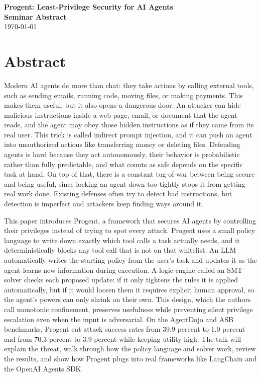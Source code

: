 \documentclass[12pt]{article}
\newcommand{\seminardate}{\today}
\begin{document}
\begin{center}
  {\LARGE\bfseries Progent: Least-Privilege Security for AI Agents}\\[8pt]
  {\large\bfseries Seminar Abstract}\\[6pt]
  {\normalsize \seminardate}
\end{center}
\vspace{1.5em}

\section*{Abstract}
Modern AI agents do more than chat: they take actions by calling external tools, such as sending emails, running code, moving files, or making payments. This makes them useful, but it also opens a dangerous door. An attacker can hide malicious instructions inside a web page, email, or document that the agent reads, and the agent may obey those hidden instructions as if they came from its real user. This trick is called indirect prompt injection, and it can push an agent into unauthorized actions like transferring money or deleting files. Defending agents is hard because they act autonomously, their behavior is probabilistic rather than fully predictable, and what counts as safe depends on the specific task at hand. On top of that, there is a constant tug-of-war between being secure and being useful, since locking an agent down too tightly stops it from getting real work done. Existing defenses often try to detect bad instructions, but detection is imperfect and attackers keep finding ways around it.

This paper introduces Progent, a framework that secures AI agents by controlling their privileges instead of trying to spot every attack. Progent uses a small policy language to write down exactly which tool calls a task actually needs, and it deterministically blocks any tool call that is not on that whitelist. An LLM automatically writes the starting policy from the user's task and updates it as the agent learns new information during execution. A logic engine called an SMT solver checks each proposed update: if it only tightens the rules it is applied automatically, but if it would loosen them it requires explicit human approval, so the agent's powers can only shrink on their own. This design, which the authors call monotonic confinement, preserves usefulness while preventing silent privilege escalation even when the input is adversarial. On the AgentDojo and ASB benchmarks, Progent cut attack success rates from 39.9 percent to 1.0 percent and from 70.3 percent to 3.9 percent while keeping utility high. The talk will explain the threat, walk through how the policy language and solver work, review the results, and show how Progent plugs into real frameworks like LangChain and the OpenAI Agents SDK.
\end{document}
